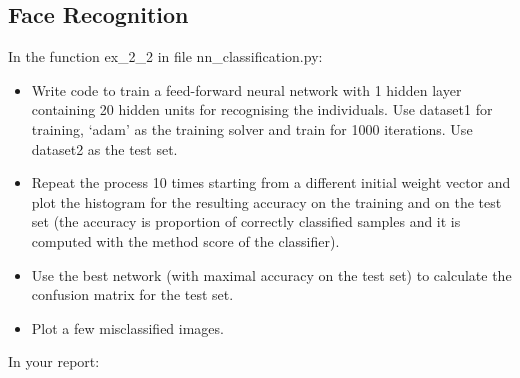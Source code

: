 \documentclass[a4paper]{article}
\begin{document}
\newpage

\subsection{Face Recognition}
In the function ex\_2\_2 in file nn\_classification.py:
\begin{itemize}
    \item Write code to train a feed-forward neural network with 1 hidden layer containing 20 hidden units for recognising the individuals. Use dataset1 for training, ‘adam’ as the training solver and train for 1000 iterations. Use dataset2 as the test set.
    \item Repeat the process 10 times starting from a different initial weight vector and plot the histogram for the resulting accuracy on the training and on the test set (the accuracy is proportion of correctly classified samples and it is computed with the method score of the classifier).
    \item Use the best network (with maximal accuracy on the test set) to calculate the confusion matrix for the test set.
	\item Plot a few misclassified images.
\end{itemize}
In your report:
\end{document}
